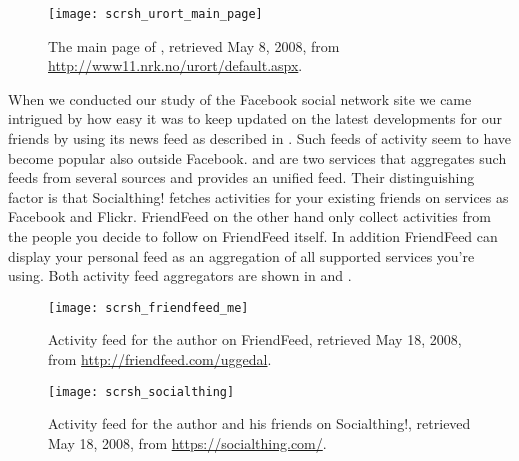 \begin{figure}
  \begin{whole}
    \centering
    \texttt{[image: scrsh\_urort\_main\_page]}
    \caption[\urort{} Main Page]{
      The main page of \urort{},
      retrieved May 8, 2008, from
      \url{http://www11.nrk.no/urort/default.aspx}.
    }
    \label{figure:scrsh.urort.main.page}
  \end{whole}
\end{figure}

When we conducted our study of the Facebook social network site we came
intrigued by how easy it was to keep updated on the latest developments for
our friends by using its news feed as described in
. 
Such feeds of activity seem to have become popular also outside Facebook.
 and  are two services that
aggregates such feeds from several sources and provides an unified feed. Their
distinguishing factor is that Socialthing! fetches activities for your
existing friends on services as Facebook and Flickr. FriendFeed on the other
hand only collect activities from the people you decide to follow on
FriendFeed itself. In addition FriendFeed can display your personal feed
as an aggregation of all supported services you're using. Both activity feed
aggregators are shown in  and
.

\begin{figure}
  \begin{whole}
    \centering
    \texttt{[image: scrsh\_friendfeed\_me]}
    \caption[FriendFeed Activity Feed]{
      Activity feed for the author on FriendFeed,
      retrieved May 18, 2008, from
      \url{http://friendfeed.com/uggedal}.
    }
    \label{figure:scrsh.friendfeed.me}
  \end{whole}
\end{figure}

\begin{figure}
  \begin{whole}
    \centering
    \texttt{[image: scrsh\_socialthing]}
    \caption[Socialthing! Activity Feed]{
      Activity feed for the author and his friends on Socialthing!,
      retrieved May 18, 2008, from
      \url{https://socialthing.com/}.
    }
    \label{figure:scrsh.socialthing}
  \end{whole}
\end{figure}

